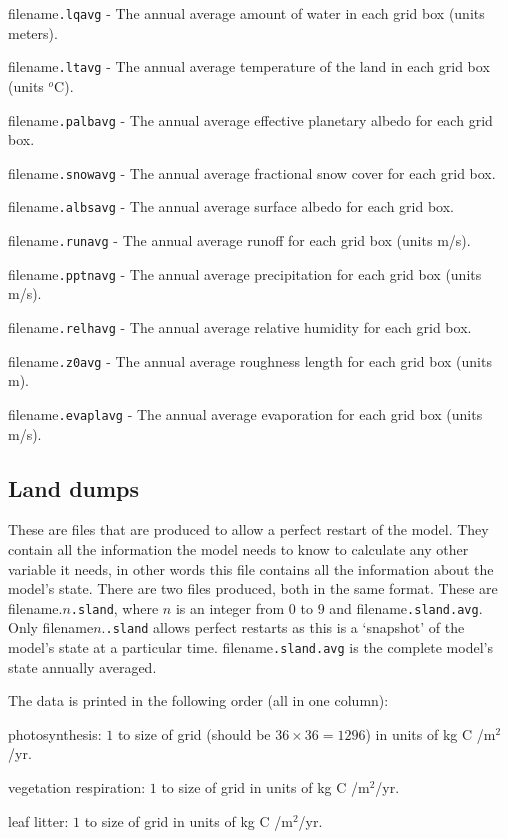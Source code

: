 \documentclass[10pt,a4paper]{report}
\begin{document}
filename{\tt.lqavg} - The annual average amount of water in each
grid box (units meters).

filename{\tt.ltavg} - The annual average temperature of the land in
each grid box (units $^{o}$C).

filename{\tt.palbavg} - The annual average effective planetary
albedo for each grid box.

filename{\tt.snowavg} - The annual average fractional snow cover for
each grid box.

filename{\tt.albsavg} - The annual average surface albedo for each
grid box.

filename{\tt.runavg} - The annual average runoff for each grid box
(units m/s).

filename{\tt.pptnavg} - The annual average precipitation for each
grid box (units m/s).

filename{\tt.relhavg} - The annual average relative humidity for
each grid box.

filename{\tt.z0avg} - The annual average roughness length for each
grid box (units m).

filename{\tt.evaplavg} - The annual average evaporation for each
grid box (units m/s).


\subsection{Land dumps}

These are files that are produced to allow a perfect restart of the
model. They contain all the information the model needs to know to
calculate any other variable it needs, in other words this file
contains all the information about the model's state. There are two
files produced, both in the same format. These are
filename.$n${\tt.sland}, where $n$ is an integer from $0$ to $9$ and
filename{\tt.sland.avg}. Only filename$n$.{\tt.sland} allows perfect
restarts as this is a `snapshot' of the model's state at a
particular time. filename{\tt.sland.avg} is the complete model's
state annually averaged.

The data is printed in the following order (all in one column):

photosynthesis: $1$ to size of grid (should be $36 \times 36 =
1296$) in units of kg C /m$^2$/yr.

vegetation respiration: $1$ to size of grid in units of kg C
/m$^2$/yr.

leaf litter: $1$ to size of grid in units of kg C /m$^2$/yr.
\end{document}
